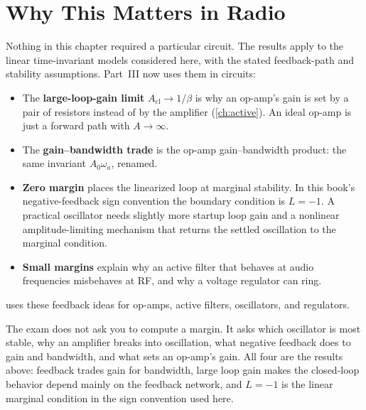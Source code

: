 \section{Why This Matters in Radio}
Nothing in this chapter required a particular circuit. The results apply to the
linear time-invariant models considered here, with the stated feedback-path and
stability assumptions. Part~III now uses them in circuits:
\begin{itemize}
\item The \textbf{large-loop-gain limit} \(A_{\mathrm{cl}}\to1/\beta\) is why an
op-amp's gain is set by a pair of resistors instead of by the amplifier
(\cref{ch:active}). An ideal op-amp is just a forward path with \(A\to\infty\).
\item The \textbf{gain--bandwidth trade} is the op-amp gain--bandwidth product: the
same invariant \(A_0\omega_a\), renamed.
\item \textbf{Zero margin} places the linearized loop at marginal stability. In
this book's negative-feedback sign convention the boundary condition is \(L=-1\).
A practical oscillator needs slightly more startup loop gain and a nonlinear
amplitude-limiting mechanism that returns the settled oscillation to the marginal
condition.
\item \textbf{Small margins} explain why an active filter that behaves at audio
frequencies misbehaves at RF, and why a voltage regulator can ring.
\end{itemize}
 uses these feedback ideas for op-amps, active filters,
oscillators, and regulators.

\begin{exambox}
The exam does not ask you to compute a margin. It asks which oscillator is most
stable, why an amplifier breaks into oscillation, what negative feedback does to
gain and bandwidth, and what sets an op-amp's gain. All four are the results
above: feedback trades gain for bandwidth, large loop gain makes the closed-loop
behavior depend mainly on the feedback network, and \(L=-1\) is the linear
marginal condition in the sign convention used here.
\end{exambox}

